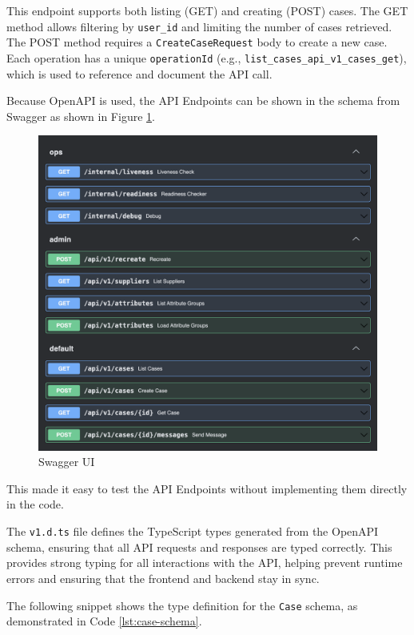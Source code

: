This endpoint supports both listing (GET) and creating (POST) cases. The GET method allows
filtering by \texttt{user\_id} and limiting the number of cases retrieved. The POST method requires a
\texttt{CreateCaseRequest} body to create a new case.
Each operation has a unique \texttt{operationId} (e.g., \texttt{list\_cases\_api\_v1\_cases\_get}), which is
used to reference and document the \ac{API} call.

Because OpenAPI is used, the \ac{API} Endpoints can be shown in the schema from Swagger as shown in Figure
\ref{fig:swaggerui}.

\begin{figure}[H]
  \centering
  \caption[Swagger UI]{Swagger UI \footnotemark}
  \label{fig:swaggerui}
  \includegraphics[width=1\textwidth]{abbildungen/Prototyping/Swagger_UI.png}
\end{figure}

This made it easy to test the \ac{API} Endpoints without implementing them directly in the code.

The \texttt{v1.d.ts} file defines the TypeScript types generated from
the OpenAPI schema, ensuring that all \ac{API} requests and
responses are typed correctly. This provides strong typing for all
interactions with the \ac{API}, helping prevent runtime errors and ensuring that the frontend and backend stay in sync.

The following snippet shows the type definition for the \texttt{Case} schema, as demonstrated in Code
\ref{lst:case-schema}.

